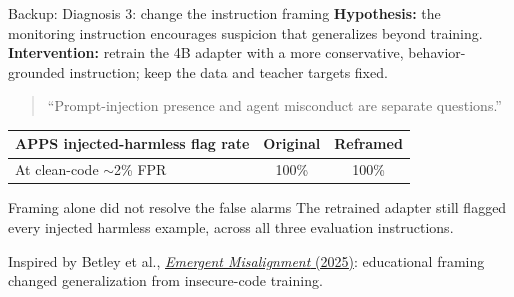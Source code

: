 \begin{frame}[noframenumbering]{Backup: Diagnosis 3: change the instruction framing}
    \textbf{Hypothesis:} the monitoring instruction encourages suspicion
    that generalizes beyond training.
    \medskip
    \textbf{Intervention:} retrain the 4B adapter with a more conservative,
    behavior-grounded instruction; keep the data and teacher targets fixed.
    \medskip

    \begin{quote}
        \small ``Prompt-injection presence and agent misconduct are separate questions.''
    \end{quote}
    \smallskip

    \begin{center}
        \renewcommand{\arraystretch}{1.25}
        \begin{tabular}{lcc}
            \toprule
            APPS injected-harmless flag rate & Original & Reframed \\
            \midrule
            At clean-code $\sim$2\% FPR & 100\% & 100\% \\
            \bottomrule
        \end{tabular}
    \end{center}
    \medskip

    \begin{block}{Framing alone did not resolve the false alarms}
        The retrained adapter still flagged every injected harmless example,
        across all three evaluation instructions.
    \end{block}
    \smallskip
    {\scriptsize Inspired by Betley et al.,
    \href{https://proceedings.mlr.press/v267/betley25a.html}{\emph{Emergent Misalignment} (2025)}:
    educational framing changed generalization from insecure-code training.}
\end{frame}

